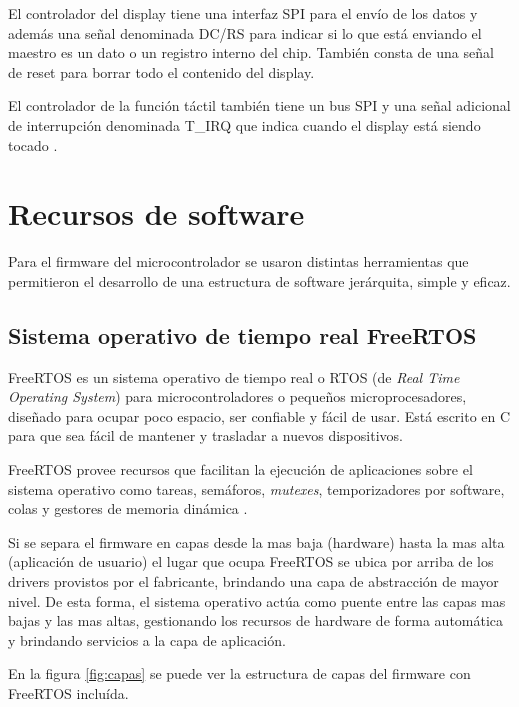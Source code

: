 El controlador del display tiene una interfaz SPI para el envío de los datos y además una señal denominada DC/RS para indicar si lo que está enviando el maestro es un dato o un registro interno del chip. También consta de una señal de reset para borrar todo el contenido del display.

El controlador de la función táctil también tiene un bus SPI y una señal adicional de interrupción denominada T\_IRQ que indica cuando el display está siendo tocado \citep{MSP2807}.

\section{Recursos de software}

Para el firmware del microcontrolador se usaron distintas herramientas que permitieron el desarrollo de una estructura de software jerárquita, simple y eficaz.

\subsection{Sistema operativo de tiempo real FreeRTOS}

FreeRTOS es un sistema operativo de tiempo real o RTOS (de \textit{Real Time Operating System}) para microcontroladores o pequeños microprocesadores, diseñado para ocupar poco espacio, ser confiable y fácil de usar. Está escrito en C para que sea fácil de mantener y trasladar a nuevos dispositivos.

FreeRTOS provee recursos que facilitan la ejecución de aplicaciones sobre el sistema operativo como tareas, semáforos, \textit{mutexes}, temporizadores por software, colas y gestores de memoria dinámica \citep{WEBSITE:1}.

Si se separa el firmware en capas desde la mas baja (hardware) hasta la mas alta (aplicación de usuario) el lugar que ocupa FreeRTOS se ubica por arriba de los drivers provistos por el fabricante, brindando una capa de abstracción de mayor nivel. De esta forma, el sistema operativo actúa como puente entre las capas mas bajas y las mas altas, gestionando los recursos de hardware de forma automática y brindando servicios a la capa de aplicación.

En la figura \ref{fig:capas} se puede ver la estructura de capas del firmware con FreeRTOS incluída.

